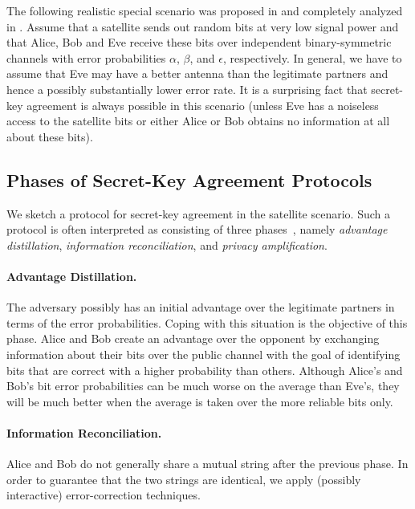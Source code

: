 \documentclass[a4paper, twoside, openany]{report}
\newcommand{\al}{\alpha}
\newcommand{\be}{\beta}
\newcommand{\eps}{\epsilon}
\theoremstyle{plain}
\theoremstyle{definition}
\begin{document}
The following realistic special scenario was proposed in \cite{ka} and completely analyzed in \cite{satellite}. Assume that a satellite sends out random bits at very low signal power and that Alice, Bob and Eve receive these bits over independent binary-symmetric channels with error probabilities $\al$, $\be$, and $\eps$, respectively.
In general, we have to assume that Eve may have a better antenna than the legitimate partners and hence a possibly substantially lower error rate. It is a surprising fact that secret-key agreement is always possible in this scenario (unless Eve has a noiseless access to the satellite bits or either Alice or Bob obtains no information at all about these bits).


\subsection{Phases of Secret-Key Agreement Protocols}

We sketch a protocol for secret-key agreement in the satellite scenario. Such a protocol is often interpreted as consisting of three phases~\cite{diss}, namely \emph{advantage distillation}, \emph{information reconciliation}, and \emph{privacy amplification}.

\paragraph{Advantage Distillation.} The adversary possibly has an initial advantage over the legitimate partners in terms of the error probabilities. Coping with this situation is the objective of this phase. Alice and Bob create an advantage over the opponent by exchanging information about their bits over the public channel with the goal of identifying bits that are correct with a higher probability than others. Although Alice's and Bob's bit error probabilities can be much worse on the average than Eve's, they will be much better when the average is taken over the more reliable bits only.

\paragraph{Information Reconciliation.} Alice and Bob do not generally share a mutual string after the previous phase. In order to guarantee that the two strings are identical, we apply (possibly interactive) error-correction techniques.
\end{document}
